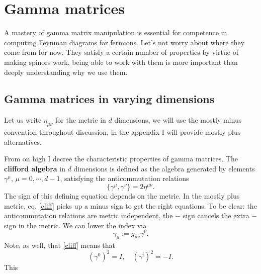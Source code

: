 \documentclass[main.tex]{subfiles}
\begin{document}
\chapter{Gamma matrices}
A mastery of gamma matrix manipulation is essential for competence in computing Feynman diagrams for fermions. Let's not worry about where they come from for now. They satisfy a certain number of properties by virtue of making spinors work, being able to work with them is more important than deeply understanding why we use them.

\section{Gamma matrices in varying dimensions}
Let us write $\eta_{\mu \nu}$ for the metric in $d$ dimensions, we will use the mostly minus convention throughout discussion, in the appendix I will provide mostly plus alternatives. 

From on high I decree the characteristic properties of gamma matrices. The \textbf{clifford algebra} in $d$ dimensions is defined as the algebra generated by elements $\gamma^\mu$, $\mu = 0,\cdots,d-1$, satisfying the anticommutation relations
\begin{equation} \label{cliff}
\{\gamma^\mu,\gamma^\nu\} = 2\eta^{\mu \nu}.
\end{equation}
The sign of this defining equation depends on the metric. In the mostly plus metric, eq. \ref{cliff} picks up a minus sign to get the right equations. To be clear: the anticommutation relations are metric independent, the $-$ sign cancels the extra $-$ sign in the metric. We can lower the index via
\[
\gamma_\mu := g_{\mu \nu} \gamma^\nu.
\]
Note, as well, that \ref{cliff} means that
\[
(\gamma^0)^2 = I, \quad (\gamma^i)^2 = -I.
\]
This 
\end{document}

